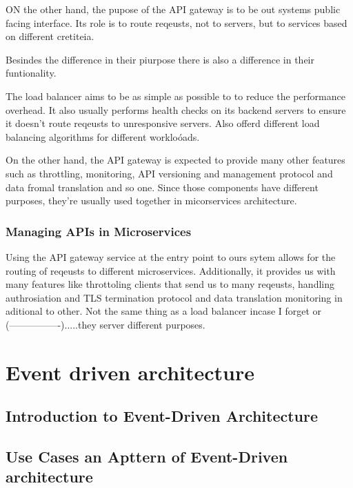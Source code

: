 \documentclass[a4paper, 11pt]{book}
\begin{document}
    ON the other hand, the pupose of the API gateway is to be out systems public facing interface.
    Its role is to route reqeusts, not to servers, but to services based on different cretiteia.

    Besindes the difference in their piurpose there is also a difference in their funtionality.

    The load balancer aims to be as simple as possible to to reduce the performance overhead.
    It also usually performs health checks on its backend servers to ensure it doesn't route reqeusts to unresponsive servers.
    Also offerd different load balancing algorithms for different workloóads.

    On the other hand, the API gateway is expected to provide many other features such as throttling, monitoring, API versioning and management protocol and data fromal translation and so one.
    Since those components have different purposes, they're usually used together in micorservices architecture.

    \subsubsection{Managing APIs in Microservices}
    Using the API gateway service at the entry point to ours sytem allows for the routing of reqeusts to different microservices.
    Additionally, it provides us with many features like throttoling clients that send us to many reqeusts, handling authrosiation and TLS termination protocol and data translation monitoring in aditional to other.
    Not the same thing as a load balancer incase I forget or (----------------).....they server different purposes.


    \section{Event driven architecture}

    \subsection{Introduction to Event-Driven Architecture}

    \subsection{Use Cases an Apttern of Event-Driven architecture}
\end{document}
